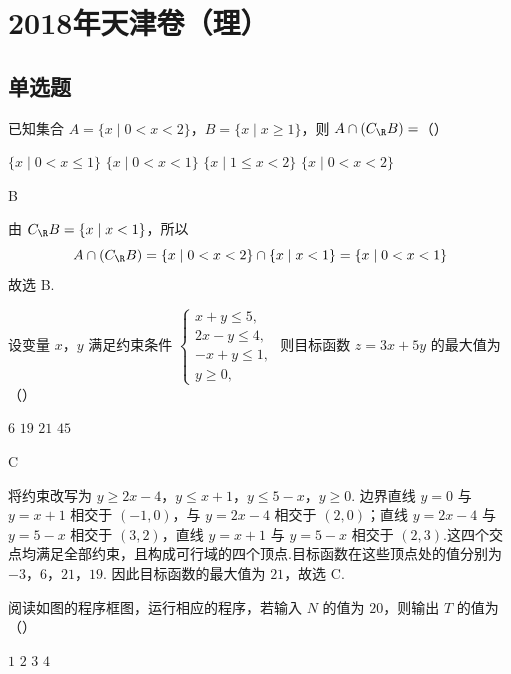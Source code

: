 \chapter{2018年天津卷（理）}

\section{单选题}

\begin{problem}
已知集合 \(A=\{x\mid 0<x<2\}\)，\(B=\{x\mid x\ge1\}\)，则 \(A\cap(C_{\R}B)=\)（\quad）

\choices
    {\(\{x\mid 0<x\le1\}\)}
    {\(\{x\mid 0<x<1\}\)}
    {\(\{x\mid 1\le x<2\}\)}
    {\(\{x\mid 0<x<2\}\)}
\end{problem}

\begin{answer}
B
\end{answer}

\begin{solution}
由 \(C_{\R}B=\{x\mid x<1\}\)，所以
\[
A\cap(C_{\R}B)=\{x\mid 0<x<2\}\cap\{x\mid x<1\}=\{x\mid 0<x<1\}
\]
故选 B.
\end{solution}

\begin{problem}
设变量 \(x\)，\(y\) 满足约束条件
\(\begin{cases}
x+y\le5,\\
2x-y\le4,\\
-x+y\le1,\\
y\ge0,
\end{cases}\)
则目标函数 \(z=3x+5y\) 的最大值为（\quad）

\choices
    {\(6\)}
    {\(19\)}
    {\(21\)}
    {\(45\)}
\end{problem}

\begin{answer}
C
\end{answer}

\begin{solution}
将约束改写为
\(y\ge 2x-4\)，\(y\le x+1\)，\(y\le5-x\)，\(y\ge0\).
边界直线 \(y=0\) 与 \(y=x+1\) 相交于 \((-1,0)\)，与 \(y=2x-4\) 相交于 \((2,0)\)；直线 \(y=2x-4\) 与 \(y=5-x\) 相交于 \((3,2)\)，直线 \(y=x+1\) 与 \(y=5-x\) 相交于 \((2,3)\).这四个交点均满足全部约束，且构成可行域的四个顶点.目标函数在这些顶点处的值分别为
\(-3\)，\(6\)，\(21\)，\(19\).
因此目标函数的最大值为 \(21\)，故选 C.
\end{solution}

\begin{problem}
阅读如图的程序框图，运行相应的程序，若输入 \(N\) 的值为 \(20\)，则输出 \(T\) 的值为（\quad）


\choices
    {\(1\)}
    {\(2\)}
    {\(3\)}
    {\(4\)}
\end{problem}

